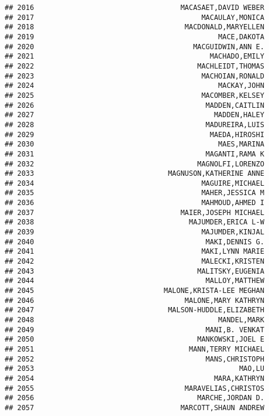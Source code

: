 \documentclass[
]{article}
\begin{document}
\begin{verbatim}
## 2016                                   MACASAET,DAVID WEBER
## 2017                                        MACAULAY,MONICA
## 2018                                    MACDONALD,MARYELLEN
## 2019                                            MACE,DAKOTA
## 2020                                      MACGUIDWIN,ANN E.
## 2021                                          MACHADO,EMILY
## 2022                                       MACHLEIDT,THOMAS
## 2023                                        MACHOIAN,RONALD
## 2024                                            MACKAY,JOHN
## 2025                                        MACOMBER,KELSEY
## 2026                                         MADDEN,CAITLIN
## 2027                                           MADDEN,HALEY
## 2028                                         MADUREIRA,LUIS
## 2029                                          MAEDA,HIROSHI
## 2030                                            MAES,MARINA
## 2031                                         MAGANTI,RAMA K
## 2032                                       MAGNOLFI,LORENZO
## 2033                                MAGNUSON,KATHERINE ANNE
## 2034                                        MAGUIRE,MICHAEL
## 2035                                        MAHER,JESSICA M
## 2036                                        MAHMOUD,AHMED I
## 2037                                   MAIER,JOSEPH MICHAEL
## 2038                                     MAJUMDER,ERICA L-W
## 2039                                        MAJUMDER,KINJAL
## 2040                                         MAKI,DENNIS G.
## 2041                                        MAKI,LYNN MARIE
## 2042                                        MALECKI,KRISTEN
## 2043                                       MALITSKY,EUGENIA
## 2044                                         MALLOY,MATTHEW
## 2045                               MALONE,KRISTA-LEE MEGHAN
## 2046                                    MALONE,MARY KATHRYN
## 2047                                MALSON-HUDDLE,ELIZABETH
## 2048                                            MANDEL,MARK
## 2049                                         MANI,B. VENKAT
## 2050                                       MANKOWSKI,JOEL E
## 2051                                     MANN,TERRY MICHAEL
## 2052                                         MANS,CHRISTOPH
## 2053                                                 MAO,LU
## 2054                                           MARA,KATHRYN
## 2055                                    MARAVELIAS,CHRISTOS
## 2056                                       MARCHE,JORDAN D.
## 2057                                   MARCOTT,SHAUN ANDREW

\end{verbatim}
\end{document}
